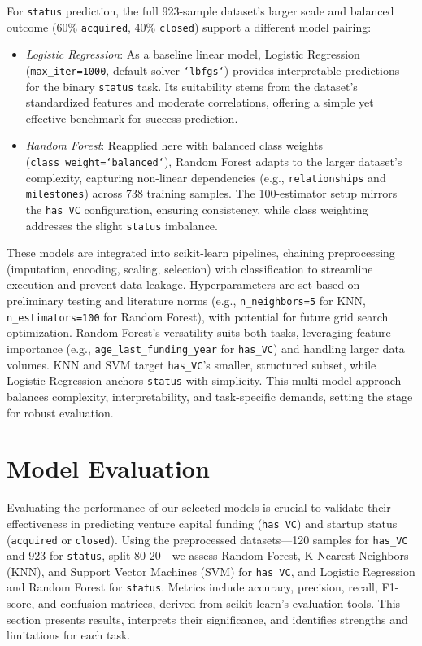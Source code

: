\documentclass[conference]{IEEEtran}
\begin{document}
    For \texttt{status} prediction, the full 923-sample dataset’s larger scale and balanced outcome (60\% \texttt{acquired}, 40\% \texttt{closed}) support a different model pairing:
    \begin{itemize}
        \item \textit{Logistic Regression}: As a baseline linear model, Logistic Regression (\texttt{max\_iter=1000}, default solver \texttt{`lbfgs`}) provides interpretable predictions for the binary \texttt{status} task. Its suitability stems from the dataset’s standardized features and moderate correlations, offering a simple yet effective benchmark for success prediction.
        \item \textit{Random Forest}: Reapplied here with balanced class weights (\texttt{class\_weight=`balanced`}), Random Forest adapts to the larger dataset’s complexity, capturing non-linear dependencies (e.g., \texttt{relationships} and \texttt{milestones}) across 738 training samples. The 100-estimator setup mirrors the \texttt{has\_VC} configuration, ensuring consistency, while class weighting addresses the slight \texttt{status} imbalance.
    \end{itemize}

    These models are integrated into scikit-learn pipelines, chaining preprocessing (imputation, encoding, scaling, selection) with classification to streamline execution and prevent data leakage. Hyperparameters are set based on preliminary testing and literature norms (e.g., \texttt{n\_neighbors=5} for KNN, \texttt{n\_estimators=100} for Random Forest), with potential for future grid search optimization. Random Forest’s versatility suits both tasks, leveraging feature importance (e.g., \texttt{age\_last\_funding\_year} for \texttt{has\_VC}) and handling larger data volumes. KNN and SVM target \texttt{has\_VC}’s smaller, structured subset, while Logistic Regression anchors \texttt{status} with simplicity. This multi-model approach balances complexity, interpretability, and task-specific demands, setting the stage for robust evaluation.


\section{Model Evaluation}
    Evaluating the performance of our selected models is crucial to validate their effectiveness in predicting venture capital funding (\texttt{has\_VC}) and startup status (\texttt{acquired} or \texttt{closed}). Using the preprocessed datasets—120 samples for \texttt{has\_VC} and 923 for \texttt{status}, split 80-20—we assess Random Forest, K-Nearest Neighbors (KNN), and Support Vector Machines (SVM) for \texttt{has\_VC}, and Logistic Regression and Random Forest for \texttt{status}. Metrics include accuracy, precision, recall, F1-score, and confusion matrices, derived from scikit-learn’s evaluation tools. This section presents results, interprets their significance, and identifies strengths and limitations for each task.
\end{document}

